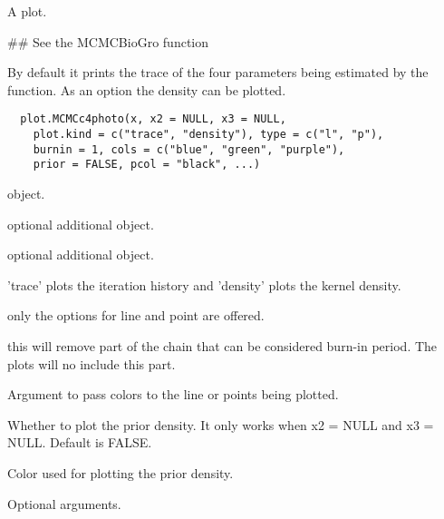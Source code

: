 \documentclass[letterpaper]{book}
\begin{document}
%
\begin{Value}
A  plot.
\end{Value}
%
\begin{SeeAlso}\relax
\end{SeeAlso}
%
\begin{Examples}
\begin{ExampleCode}
## See the MCMCBioGro function
\end{ExampleCode}
\end{Examples}
%
\begin{Description}\relax
By default it prints the trace of the four parameters
being estimated by the 
function. As an option the density can be plotted.
\end{Description}
%
\begin{Usage}
\begin{verbatim}
  plot.MCMCc4photo(x, x2 = NULL, x3 = NULL,
    plot.kind = c("trace", "density"), type = c("l", "p"),
    burnin = 1, cols = c("blue", "green", "purple"),
    prior = FALSE, pcol = "black", ...)
\end{verbatim}
\end{Usage}
%
\begin{Arguments}
\begin{ldescription}
\item[\code{x}]  object.

\item[\code{x2}] optional additional 
object.

\item[\code{x3}] optional additional 
object.

\item[\code{plot.kind}] 'trace' plots the iteration history and
'density' plots the kernel density.

\item[\code{type}] only the options for line and point are
offered.

\item[\code{burnin}] this will remove part of the chain that can
be considered burn-in period.  The plots will no include
this part.

\item[\code{cols}] Argument to pass colors to the line or points
being plotted.

\item[\code{prior}] Whether to plot the prior density. It only
works when x2 = NULL and x3 = NULL. Default is FALSE.

\item[\code{pcol}] Color used for plotting the prior density.

\item[\code{...}] Optional arguments.
\end{ldescription}
\end{Arguments}
\end{document}
